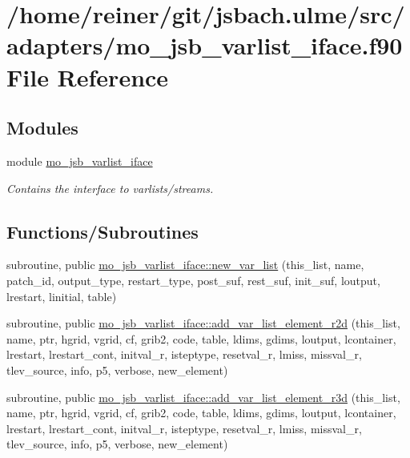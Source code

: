\hypertarget{mo__jsb__varlist__iface_8f90}{}\section{/home/reiner/git/jsbach.ulme/src/adapters/mo\+\_\+jsb\+\_\+varlist\+\_\+iface.f90 File Reference}
\label{mo__jsb__varlist__iface_8f90}
\subsection*{Modules}
\begin{DoxyCompactItemize}
\item 
module \hyperlink{namespacemo__jsb__varlist__iface}{mo\+\_\+jsb\+\_\+varlist\+\_\+iface}
\begin{DoxyCompactList}\small\item\em Contains the interface to varlists/streams. \end{DoxyCompactList}\end{DoxyCompactItemize}
\subsection*{Functions/\+Subroutines}
\begin{DoxyCompactItemize}
\item 
subroutine, public \hyperlink{namespacemo__jsb__varlist__iface_a169b8d752d071050ff305239fe73dbfc}{mo\+\_\+jsb\+\_\+varlist\+\_\+iface\+::new\+\_\+var\+\_\+list} (this\+\_\+list, name, patch\+\_\+id, output\+\_\+type, restart\+\_\+type, post\+\_\+suf, rest\+\_\+suf, init\+\_\+suf, loutput, lrestart, linitial, table)
\item 
subroutine, public \hyperlink{namespacemo__jsb__varlist__iface_a1a7673f9db168055de30bc6f735a7ecb}{mo\+\_\+jsb\+\_\+varlist\+\_\+iface\+::add\+\_\+var\+\_\+list\+\_\+element\+\_\+r2d} (this\+\_\+list, name, ptr, hgrid, vgrid, cf, grib2, code, table, ldims, gdims, loutput, lcontainer, lrestart, lrestart\+\_\+cont, initval\+\_\+r, isteptype, resetval\+\_\+r, lmiss, missval\+\_\+r, tlev\+\_\+source, info, p5, verbose, new\+\_\+element)
\item 
subroutine, public \hyperlink{namespacemo__jsb__varlist__iface_a0bb929b116f163f5cbe5e680073ca3b2}{mo\+\_\+jsb\+\_\+varlist\+\_\+iface\+::add\+\_\+var\+\_\+list\+\_\+element\+\_\+r3d} (this\+\_\+list, name, ptr, hgrid, vgrid, cf, grib2, code, table, ldims, gdims, loutput, lcontainer, lrestart, lrestart\+\_\+cont, initval\+\_\+r, isteptype, resetval\+\_\+r, lmiss, missval\+\_\+r, tlev\+\_\+source, info, p5, verbose, new\+\_\+element)
\end{DoxyCompactItemize}
